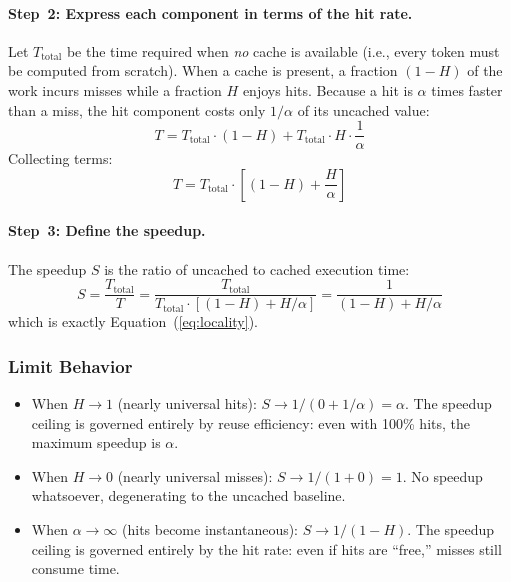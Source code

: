 \paragraph{Step~2: Express each component in terms of the hit rate.}
Let $T_{\mathrm{total}}$ be the time required when \emph{no} cache is available (i.e., every token must be computed from scratch). When a cache is present, a fraction $(1-H)$ of the work incurs misses while a fraction $H$ enjoys hits. Because a hit is $\alpha$ times faster than a miss, the hit component costs only $1/\alpha$ of its uncached value:
\begin{equation}
T = T_{\mathrm{total}} \cdot (1-H) + T_{\mathrm{total}} \cdot H \cdot \frac{1}{\alpha}
\end{equation}
Collecting terms:
\begin{equation}
T = T_{\mathrm{total}} \cdot \left[(1-H) + \frac{H}{\alpha}\right]
\end{equation}

\paragraph{Step~3: Define the speedup.}
The speedup $S$ is the ratio of uncached to cached execution time:
\begin{equation}
S = \frac{T_{\mathrm{total}}}{T} = \frac{T_{\mathrm{total}}}{T_{\mathrm{total}} \cdot \left[(1-H) + H/\alpha\right]} = \frac{1}{(1-H) + H/\alpha}
\end{equation}
which is exactly Equation~(\ref{eq:locality}).

\subsubsection{Limit Behavior}

\begin{itemize}[nosep]
\item When $H \to 1$ (nearly universal hits): $S \to 1/(0 + 1/\alpha) = \alpha$. The speedup ceiling is governed entirely by reuse efficiency: even with 100\% hits, the maximum speedup is $\alpha$.

\item When $H \to 0$ (nearly universal misses): $S \to 1/(1 + 0) = 1$. No speedup whatsoever, degenerating to the uncached baseline.

\item When $\alpha \to \infty$ (hits become instantaneous): $S \to 1/(1-H)$. The speedup ceiling is governed entirely by the hit rate: even if hits are ``free,'' misses still consume time.
\end{itemize}

